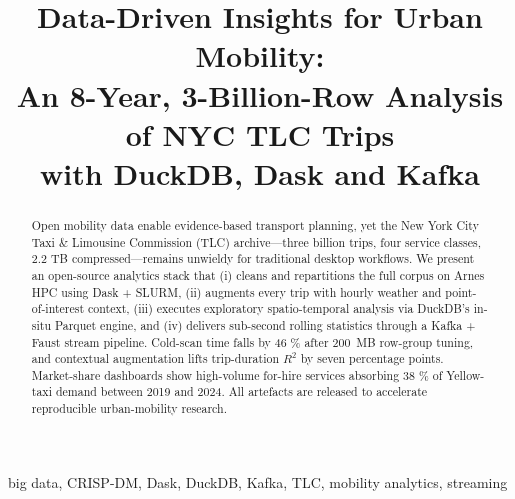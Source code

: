 \documentclass[conference]{IEEEtran}
\begin{document}
\title{Data-Driven Insights for Urban Mobility:\\
  An 8-Year, 3-Billion-Row Analysis of NYC TLC Trips\\
with DuckDB, Dask and Kafka}

\author{
  \and
  }

\maketitle

\begin{abstract}
  Open mobility data enable evidence-based transport planning, yet the
  New York City Taxi \& Limousine Commission (TLC) archive—three billion
  trips, four service classes, 2.2 TB compressed—remains unwieldy for
  traditional desktop workflows.
  We present an open-source analytics stack that (i) cleans and
  repartitions the full corpus on Arnes HPC using Dask + SLURM,
  (ii) augments every trip with hourly weather and point-of-interest
  context, (iii) executes exploratory spatio-temporal analysis via
  DuckDB’s in-situ Parquet engine, and (iv) delivers sub-second rolling
  statistics through a Kafka + Faust stream pipeline.
  Cold-scan time falls by 46 \% after \SI{200}{MB} row-group tuning, and
  contextual augmentation lifts trip-duration \(R^{2}\) by seven
  percentage points.
  Market-share dashboards show high-volume for-hire services absorbing
  38 \% of Yellow-taxi demand between 2019 and 2024.
  All artefacts are released to accelerate reproducible
  urban-mobility research.
\end{abstract}

\begin{IEEEkeywords}
  big data, CRISP-DM, Dask, DuckDB, Kafka, TLC, mobility analytics,
  streaming
\end{IEEEkeywords}

\end{document}
